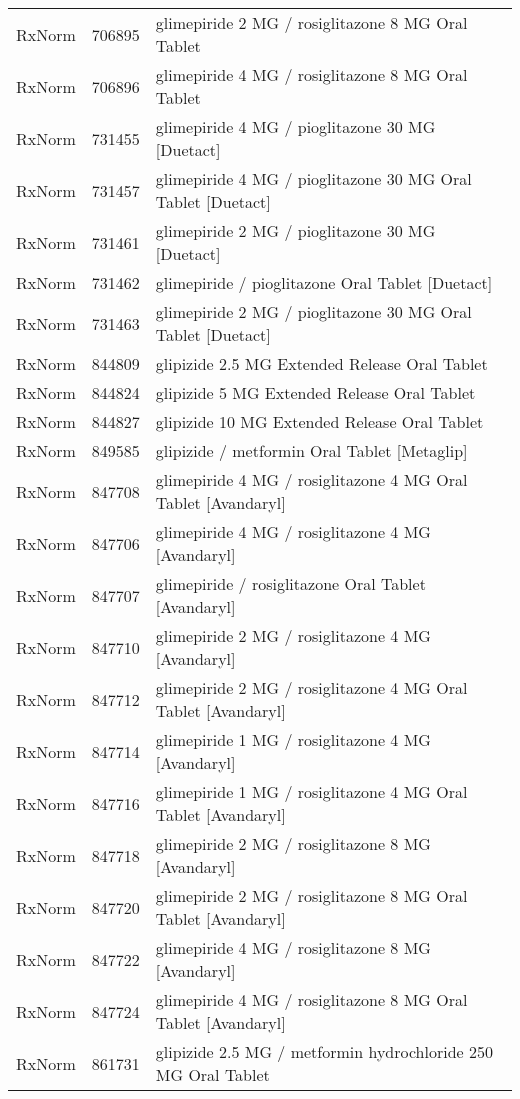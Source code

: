 \begin{longtable}{p{}p{}p{}}
  RxNorm & 706895 & glimepiride 2 MG / rosiglitazone 8 MG Oral Tablet \\ 
  RxNorm & 706896 & glimepiride 4 MG / rosiglitazone 8 MG Oral Tablet \\ 
  RxNorm & 731455 & glimepiride 4 MG / pioglitazone 30 MG [Duetact] \\ 
  RxNorm & 731457 & glimepiride 4 MG / pioglitazone 30 MG Oral Tablet [Duetact] \\ 
  RxNorm & 731461 & glimepiride 2 MG / pioglitazone 30 MG [Duetact] \\ 
  RxNorm & 731462 & glimepiride / pioglitazone Oral Tablet [Duetact] \\ 
  RxNorm & 731463 & glimepiride 2 MG / pioglitazone 30 MG Oral Tablet [Duetact] \\ 
  RxNorm & 844809 & glipizide 2.5 MG Extended Release Oral Tablet \\ 
  RxNorm & 844824 & glipizide 5 MG Extended Release Oral Tablet \\ 
  RxNorm & 844827 & glipizide 10 MG Extended Release Oral Tablet \\ 
  RxNorm & 849585 & glipizide / metformin Oral Tablet [Metaglip] \\ 
  RxNorm & 847708 & glimepiride 4 MG / rosiglitazone 4 MG Oral Tablet [Avandaryl] \\ 
  RxNorm & 847706 & glimepiride 4 MG / rosiglitazone 4 MG [Avandaryl] \\ 
  RxNorm & 847707 & glimepiride / rosiglitazone Oral Tablet [Avandaryl] \\ 
  RxNorm & 847710 & glimepiride 2 MG / rosiglitazone 4 MG [Avandaryl] \\ 
  RxNorm & 847712 & glimepiride 2 MG / rosiglitazone 4 MG Oral Tablet [Avandaryl] \\ 
  RxNorm & 847714 & glimepiride 1 MG / rosiglitazone 4 MG [Avandaryl] \\ 
  RxNorm & 847716 & glimepiride 1 MG / rosiglitazone 4 MG Oral Tablet [Avandaryl] \\ 
  RxNorm & 847718 & glimepiride 2 MG / rosiglitazone 8 MG [Avandaryl] \\ 
  RxNorm & 847720 & glimepiride 2 MG / rosiglitazone 8 MG Oral Tablet [Avandaryl] \\ 
  RxNorm & 847722 & glimepiride 4 MG / rosiglitazone 8 MG [Avandaryl] \\ 
  RxNorm & 847724 & glimepiride 4 MG / rosiglitazone 8 MG Oral Tablet [Avandaryl] \\ 
  RxNorm & 861731 & glipizide 2.5 MG / metformin hydrochloride 250 MG Oral Tablet \\ 

\end{longtable}
